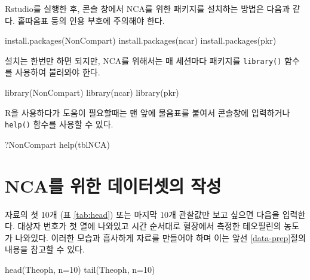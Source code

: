 \documentclass[
  11pt,
  krantz2, a4paper, twoside]{krantz}
\newenvironment{Shaded}{\begin{snugshade}}{\end{snugshade}}
\newcommand{\AttributeTok}[1]{\textcolor[rgb]{0.77,0.63,0.00}{#1}}
\newcommand{\DecValTok}[1]{\textcolor[rgb]{0.00,0.00,0.81}{#1}}
\newcommand{\FunctionTok}[1]{\textcolor[rgb]{0.00,0.00,0.00}{#1}}
\newcommand{\NormalTok}[1]{#1}
\newcommand{\StringTok}[1]{\textcolor[rgb]{0.31,0.60,0.02}{#1}}
\theoremstyle{definition}
\theoremstyle{definition}
\theoremstyle{definition}
\theoremstyle{definition}
\theoremstyle{remark}
\begin{document}
Rstudio를 실행한 후, 콘솔 창에서 NCA를 위한 패키지를 설치하는 방법은 다음과 같다. 홑따옴표 등의 인용 부호에 주의해야 한다.

\begin{Shaded}
\begin{Highlighting}[]
\FunctionTok{install.packages}\NormalTok{(}\StringTok{\textquotesingle{}NonCompart\textquotesingle{}}\NormalTok{)}
\FunctionTok{install.packages}\NormalTok{(}\StringTok{\textquotesingle{}ncar\textquotesingle{}}\NormalTok{)}
\FunctionTok{install.packages}\NormalTok{(}\StringTok{\textquotesingle{}pkr\textquotesingle{}}\NormalTok{)}
\end{Highlighting}
\end{Shaded}

설치는 한번만 하면 되지만, NCA를 위해서는 매 세션마다 패키지를 \texttt{library()} 함수를 사용하여 불러와야 한다.

\begin{Shaded}
\begin{Highlighting}[]
\FunctionTok{library}\NormalTok{(NonCompart)}
\FunctionTok{library}\NormalTok{(ncar)}
\FunctionTok{library}\NormalTok{(pkr)}
\end{Highlighting}
\end{Shaded}

R을 사용하다가 도움이 필요할때는 맨 앞에 물음표를 붙여서 콘솔창에 입력하거나 \texttt{help()} 함수를 사용할 수 있다.

\begin{Shaded}
\begin{Highlighting}[]
\NormalTok{?NonCompart}
\FunctionTok{help}\NormalTok{(tblNCA)}
\end{Highlighting}
\end{Shaded}

\hypertarget{ncauxb97c-uxc704uxd55c-uxb370uxc774uxd130uxc14buxc758-uxc791uxc131}{%
\section{NCA를 위한 데이터셋의 작성}\label{ncauxb97c-uxc704uxd55c-uxb370uxc774uxd130uxc14buxc758-uxc791uxc131}}

자료의 첫 10개 (표 \ref{tab:head}) 또는 마지막 10개 관찰값만 보고 싶으면 다음을 입력한다.
대상자 번호가 첫 열에 나와있고 시간 순서대로 혈장에서 측정한 테오필린의 농도가 나와있다.
이러한 모습과 흡사하게 자료를 만들어야 하며 이는 앞선 \ref{data-prep}절의 내용을 참고할 수 있다.

\begin{Shaded}
\begin{Highlighting}[]
\FunctionTok{head}\NormalTok{(Theoph, }\AttributeTok{n=}\DecValTok{10}\NormalTok{)}
\FunctionTok{tail}\NormalTok{(Theoph, }\AttributeTok{n=}\DecValTok{10}\NormalTok{)}
\end{Highlighting}
\end{Shaded}
\end{document}
